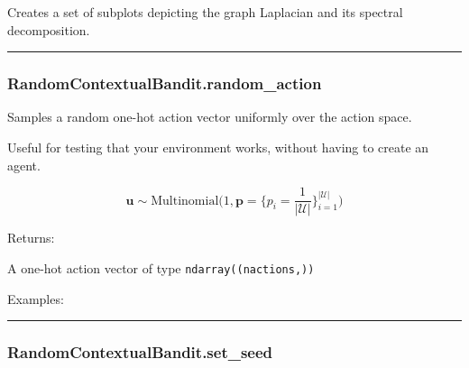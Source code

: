 Creates a set of subplots depicting the graph Laplacian and its spectral
decomposition.

\begin{center}\rule{0.5\linewidth}{\linethickness}\end{center}

\subsubsection{RandomContextualBandit.random\_action}\label{randomcontextualbandit.random_action}

\begin{Shaded}
\begin{Highlighting}[]
\NormalTok{)}
\end{Highlighting}
\end{Shaded}

Samples a random one-hot action vector uniformly over the action space.

Useful for testing that your environment works, without having to create
an agent.

\[
\mathbf u \sim \mathrm{Multinomial}\Big(1, \mathbf p=\{p_i = \frac{1}{|\mathcal U|}\}_{i=1}^{|\mathcal U|}\Big)
\]

Returns:

A one-hot action vector of type \texttt{ndarray((nactions,))}

Examples:

\begin{Shaded}
\begin{Highlighting}[]
\OperatorTok{=}
\end{Highlighting}
\end{Shaded}

\begin{center}\rule{0.5\linewidth}{\linethickness}\end{center}

\subsubsection{RandomContextualBandit.set\_seed}\label{randomcontextualbandit.set_seed}

\begin{Shaded}
\begin{Highlighting}[]
\OperatorTok{=}\NormalTok{)}
\end{Highlighting}
\end{Shaded}

